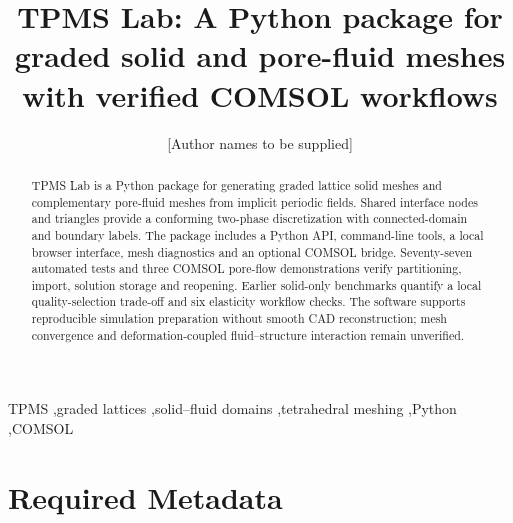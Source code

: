 \documentclass[preprint,12pt,a4paper]{elsarticle}
\begin{document}
\begin{frontmatter}
\title{TPMS Lab: A Python package for graded solid and pore-fluid meshes with verified COMSOL workflows}
\author{[Author names to be supplied]}
\address{[Affiliations and postal addresses to be supplied]}
\begin{abstract}
TPMS Lab is a Python package for generating graded lattice solid meshes and complementary pore-fluid meshes from implicit periodic fields. Shared interface nodes and triangles provide a conforming two-phase discretization with connected-domain and boundary labels. The package includes a Python API, command-line tools, a local browser interface, mesh diagnostics and an optional COMSOL bridge. Seventy-seven automated tests and three COMSOL pore-flow demonstrations verify partitioning, import, solution storage and reopening. Earlier solid-only benchmarks quantify a local quality-selection trade-off and six elasticity workflow checks. The software supports reproducible simulation preparation without smooth CAD reconstruction; mesh convergence and deformation-coupled fluid--structure interaction remain unverified.
\end{abstract}
\begin{keyword}
TPMS \sep graded lattices \sep solid--fluid domains \sep tetrahedral meshing \sep Python \sep COMSOL
\end{keyword}
\end{frontmatter}
\clearpage
\section*{Required Metadata}
\end{document}
